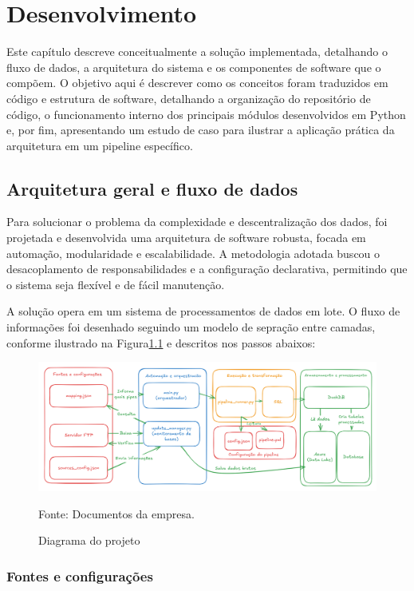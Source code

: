 \chapter{Desenvolvimento}

Este capítulo descreve conceitualmente a solução implementada, detalhando o fluxo de dados, a arquitetura do sistema e os componentes de software que o compõem. O objetivo aqui é descrever como os conceitos foram traduzidos em código e estrutura de software, detalhando a organização do repositório de código, o funcionamento interno dos principais módulos desenvolvidos em Python e, por fim, apresentando um estudo de caso para ilustrar a aplicação prática da arquitetura em um pipeline específico.

\section{Arquitetura geral e fluxo de dados}

Para solucionar o problema da complexidade e descentralização dos dados, foi projetada e desenvolvida uma arquitetura de software robusta, focada em automação, modularidade e escalabilidade. A metodologia adotada buscou o desacoplamento de responsabilidades e a configuração declarativa, permitindo que o sistema seja flexível e de fácil manutenção.

A solução opera em um sistema de processamentos de dados em lote. O fluxo de informações foi desenhado seguindo um modelo de sepração entre camadas, conforme ilustrado na Figura\ref{fig:diagrama} e descritos nos passos abaixos: 

\begin{figure}[H]
  \centering
  \caption{Diagrama do projeto}\label{fig:diagrama}
  \includegraphics[width=1\linewidth]{imagens/diagrama.png}
  \par
  \footnotesize{Fonte: Documentos da empresa.}
\end{figure}

\subsection{Fontes e configurações}

